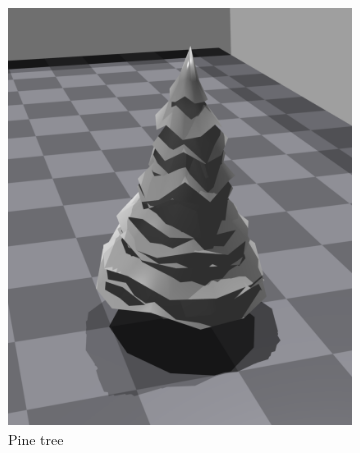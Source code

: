 \begin{figure}[H]
\begin{subfigure}[b]{0.3\textwidth}
         \includegraphics[width=\textwidth]{figures/6_/pine_tree.png}
         \caption{Pine tree}
         \label{fig:6_obst_pine_tree}
     \end{subfigure} 
     \hfill \\[2mm]
     \hspace{0.04\textwidth}
     \begin{subfigure}[b]{0.3\textwidth}
         \centering
         \captionsetup{justification=centering}

\end{subfigure}
\end{figure}
